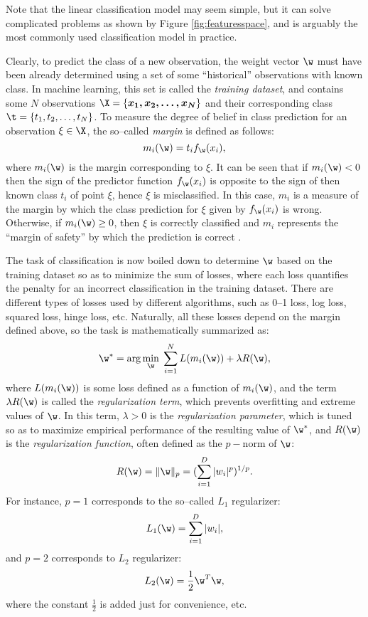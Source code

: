Note that the linear classification model may seem simple, but it can solve complicated problems as shown by Figure \ref{fig:featuresspace}, and is arguably the most commonly used classification model in practice. 

Clearly, to predict the class of a new observation, the weight vector $\w$ must have been already determined using a set of some ``historical'' observations with known class. In machine learning, this set is called the \emph{training dataset}, and contains some $N$ observations $\X = \{\boldsymbol{x_1, x_2, \dots, x_N}\}$ and their corresponding class $\t = \{t_1, t_2, \dots, t_N\}$. To measure the degree of belief in class prediction for an observation $\xi \in \X$, the so--called \emph{margin} is defined as follows:
\begin{equation} 
\label{eq:margin}
m_i(\w) = t_i f_{\w}(x_i),
\end{equation}
where $m_i(\w)$ is the margin corresponding to $\xi$. It can be seen that if $m_i(\w) < 0$ then the sign of the predictor function $f_{\w}(x_i)$ is opposite to the sign of then known class $t_i$ of point $\xi$, hence $\xi$ is misclassified. In this case, $m_i$ is a measure of the margin by which the class prediction for $\xi$ given by $f_{\w}(x_i)$ is wrong. Otherwise, if $m_i(\w) \geq 0$, then $\xi$ is correctly classified and $m_i$ represents the ``margin of safety'' by which the prediction is correct \cite{McAllester}.  

The task of classification is now boiled down to determine $\w$ based on the training dataset so as to minimize the sum of losses, where each loss quantifies the penalty for an incorrect classification in the training dataset. There are different types of losses used by different algorithms, such as 0--1 loss, log loss, squared loss, hinge loss, etc. Naturally, all these losses depend on the margin defined above, so the task is mathematically summarized as:
\begin{equation}
\label{eq:objective}
 \w^* = \arg\min_{\w} \; \sum_{i=1}^{N} L(m_i(\w)) + \lambda R(\w),
\end{equation}
where $L(m_i(\w))$ is some loss defined as a function of $m_i(\w)$, and the term $\lambda R(\w)$ is called the \emph{regularization term}, which prevents overfitting and extreme values of $\w$. In this term, $\lambda > 0$ is the \emph{regularization parameter}, which is tuned so as to maximize empirical performance of the resulting value of $\w^*$, and $R(\w)$ is the \emph{regularization function}, often defined as the $p-$norm of $\w$: 
$$R(\w) = \| \w \|_p = (\sum_{i=1}^D |w_i|^p)^{1/p}.$$
For instance, $p=1$ corresponds to the so--called $L_1$ regularizer: $$L_1(\w) = \sum_{i=1}^D |w_i|,$$ 
and $p=2$ corresponds to $L_2$ regularizer: $$L_2(\w) = \frac{1}{2} \w^T \w,$$ where the constant $\frac{1}{2}$ is added just for convenience, etc. 

